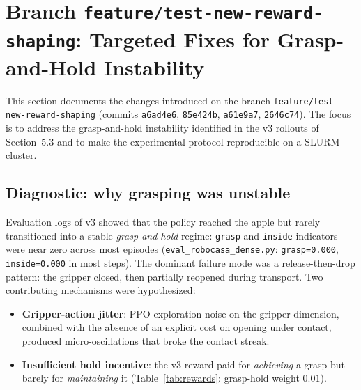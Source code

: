 \documentclass[11pt]{article}
\begin{document}
\section{Branch \texttt{feature/test-new-reward-shaping}: Targeted Fixes for Grasp-and-Hold Instability}
\label{sec:branch}

This section documents the changes introduced on the branch
\texttt{feature/test-new-reward-shaping} (commits
\texttt{a6ad4e6}, \texttt{85e424b}, \texttt{a61e9a7}, \texttt{2646c74}). The
focus is to address the grasp-and-hold instability identified in the v3 rollouts
of Section~5.3 and to make the experimental protocol reproducible on a SLURM
cluster.

\subsection{Diagnostic: why grasping was unstable}
Evaluation logs of v3 showed that the policy reached the apple but rarely
transitioned into a stable \emph{grasp-and-hold} regime: \texttt{grasp} and
\texttt{inside} indicators were near zero across most episodes
(\texttt{eval\_robocasa\_dense.py}: \texttt{grasp=0.000}, \texttt{inside=0.000}
in most steps). The dominant failure mode was a release-then-drop pattern:
the gripper closed, then partially reopened during transport. Two contributing
mechanisms were hypothesized:
\begin{itemize}
  \item \textbf{Gripper-action jitter}: PPO exploration noise on the gripper
    dimension, combined with the absence of an explicit cost on opening under
    contact, produced micro-oscillations that broke the contact streak.
  \item \textbf{Insufficient hold incentive}: the v3 reward paid for
    \emph{achieving} a grasp but barely for \emph{maintaining} it
    (Table~\ref{tab:rewards}: grasp-hold weight $0.01$).
\end{itemize}
\end{document}
